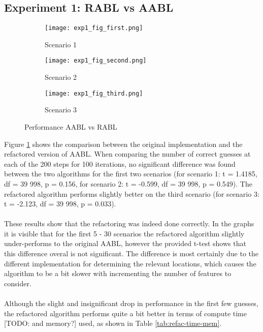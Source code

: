 \documentclass{article}
\begin{document}
\subsection{Experiment 1: RABL vs AABL}
\begin{figure}[H]
    \centering
    \begin{subfigure}[b]{0.45\textwidth}
        \texttt{[image: exp1\_fig\_first.png]}
        \caption{Scenario 1}
    \end{subfigure}
    \begin{subfigure}[b]{0.45\textwidth}
        \texttt{[image: exp1\_fig\_second.png]}
        \caption{Scenario 2}
    \end{subfigure}
    \begin{subfigure}[b]{0.45\textwidth}
        \texttt{[image: exp1\_fig\_third.png]}
        \caption{Scenario 3}
    \end{subfigure}
    \caption{Performance AABL vs RABL}
    \label{fig:exp1-results.png}
\end{figure}
Figure \ref{fig:exp1-results.png} shows the comparison between the original implementation and the refactored version of AABL. When comparing the number of correct guesses at each of the 200 steps for 100 iterations, no significant difference was found between the two algorithms for the first two scenarios (for scenario 1: t = 1.4185, df = 39 998, p = 0.156, for scenario 2: t = -0.599, df = 39 998, p = 0.549). The refactored algorithm performs slightly better on the third scenario (for scenario 3: t = -2.123, df = 39 998, p = 0.033).
\\\\
These results show that the refactoring was indeed done correctly. In the graphs it is visible that for the first 5 - 30 scenarios the refactored algorithm slightly under-performs to the original AABL, however the provided t-test shows that this difference overal is not significant. The difference is most certainly due to the different implementation for determining the relevant locations, which causes the algorithm to be a bit slower with incrementing the number of features to consider.
\\\\
Although the slight and insignificant drop in performance in the first few guesses, the refactored algorithm performs quite a bit better in terms of compute time [TODO: and memory?] used, as shown in Table \ref{tab:refac-time-mem}.
\end{document}
